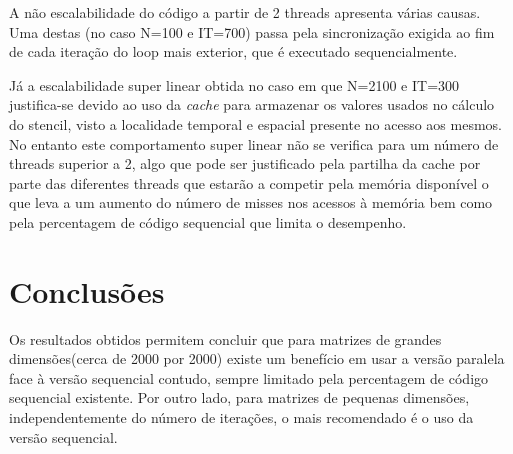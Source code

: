 \documentclass{article}
\begin{document}
A não escalabilidade do código a partir de 2 threads apresenta várias causas.
Uma destas (no caso N=100 e IT=700) passa pela sincronização exigida ao fim de cada iteração do loop mais exterior, que é executado sequencialmente.

Já a escalabilidade super linear obtida no caso em que N=2100 e IT=300 justifica-se devido ao uso da \textit{cache} para armazenar os valores usados no cálculo do stencil, visto a localidade temporal e espacial presente no acesso aos mesmos. No entanto este comportamento super linear não se verifica para um número de threads superior a 2, algo que pode ser justificado pela partilha da cache por parte das diferentes threads que estarão a competir pela memória disponível o que leva a um aumento do número de misses nos acessos à memória bem como pela percentagem de código sequencial que limita o desempenho.

\section{Conclusões}
Os resultados obtidos permitem concluir que para matrizes de grandes dimensões(cerca de 2000 por 2000) existe um benefício em usar a versão paralela face à versão sequencial contudo, sempre limitado pela percentagem de código sequencial existente. Por outro lado, para matrizes de pequenas dimensões, independentemente do número de iterações, o mais recomendado é o uso da versão sequencial.
\end{document}
